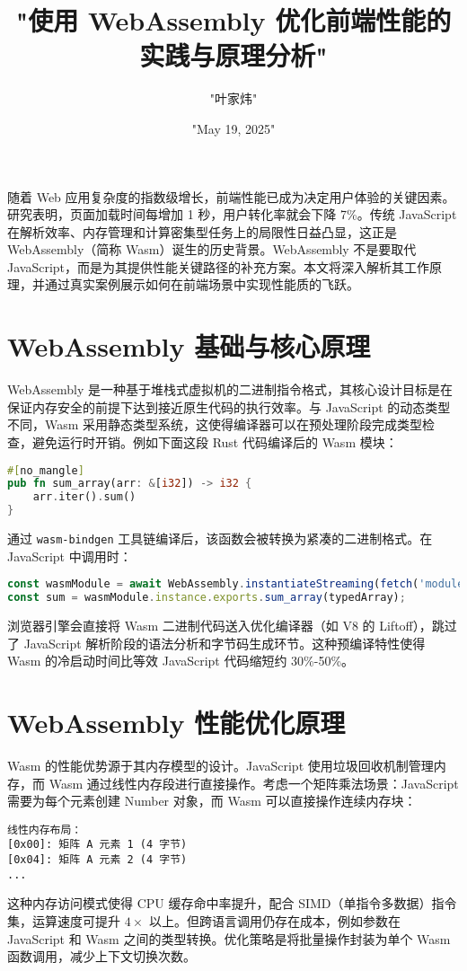 \title{"使用 WebAssembly 优化前端性能的实践与原理分析"}
\author{"叶家炜"}
\date{"May 19, 2025"}
\maketitle
随着 Web 应用复杂度的指数级增长，前端性能已成为决定用户体验的关键因素。研究表明，页面加载时间每增加 1 秒，用户转化率就会下降 7\%{}。传统 JavaScript 在解析效率、内存管理和计算密集型任务上的局限性日益凸显，这正是 WebAssembly（简称 Wasm）诞生的历史背景。WebAssembly 不是要取代 JavaScript，而是为其提供性能关键路径的补充方案。本文将深入解析其工作原理，并通过真实案例展示如何在前端场景中实现性能质的飞跃。\par
\chapter{WebAssembly 基础与核心原理}
WebAssembly 是一种基于堆栈式虚拟机的二进制指令格式，其核心设计目标是在保证内存安全的前提下达到接近原生代码的执行效率。与 JavaScript 的动态类型不同，Wasm 采用静态类型系统，这使得编译器可以在预处理阶段完成类型检查，避免运行时开销。例如下面这段 Rust 代码编译后的 Wasm 模块：\par
\begin{lstlisting}[language=rust]
#[no_mangle]
pub fn sum_array(arr: &[i32]) -> i32 {
    arr.iter().sum()
}
\end{lstlisting}
通过 \verb!wasm-bindgen! 工具链编译后，该函数会被转换为紧凑的二进制格式。在 JavaScript 中调用时：\par
\begin{lstlisting}[language=javascript]
const wasmModule = await WebAssembly.instantiateStreaming(fetch('module.wasm'));
const sum = wasmModule.instance.exports.sum_array(typedArray);
\end{lstlisting}
浏览器引擎会直接将 Wasm 二进制代码送入优化编译器（如 V8 的 Liftoff），跳过了 JavaScript 解析阶段的语法分析和字节码生成环节。这种预编译特性使得 Wasm 的冷启动时间比等效 JavaScript 代码缩短约 30\%{}-50\%{}。\par
\chapter{WebAssembly 性能优化原理}
Wasm 的性能优势源于其内存模型的设计。JavaScript 使用垃圾回收机制管理内存，而 Wasm 通过线性内存段进行直接操作。考虑一个矩阵乘法场景：JavaScript 需要为每个元素创建 Number 对象，而 Wasm 可以直接操作连续内存块：\par
\begin{lstlisting}
线性内存布局：
[0x00]: 矩阵 A 元素 1 (4 字节)
[0x04]: 矩阵 A 元素 2 (4 字节)
...
\end{lstlisting}
这种内存访问模式使得 CPU 缓存命中率提升，配合 SIMD（单指令多数据）指令集，运算速度可提升 $4\times$ 以上。但跨语言调用仍存在成本，例如参数在 JavaScript 和 Wasm 之间的类型转换。优化策略是将批量操作封装为单个 Wasm 函数调用，减少上下文切换次数。\par
